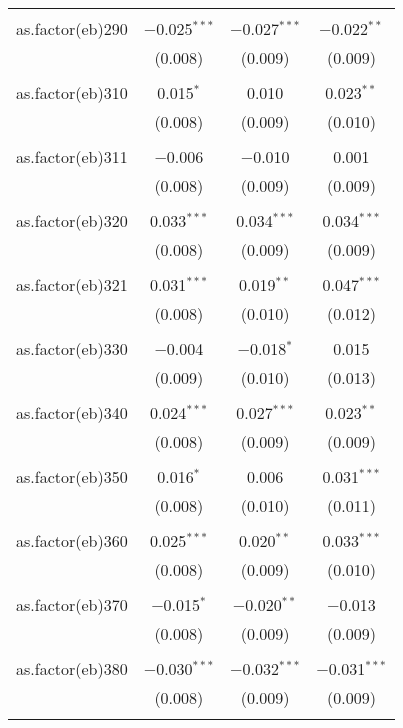 \begin{table}[!htbp]
\begin{tabular}{@{\extracolsep{5pt}}lccc}
  & & & \\ 
 as.factor(eb)290 & $-$0.025$^{***}$ & $-$0.027$^{***}$ & $-$0.022$^{**}$ \\ 
  & (0.008) & (0.009) & (0.009) \\ 
  & & & \\ 
 as.factor(eb)310 & 0.015$^{*}$ & 0.010 & 0.023$^{**}$ \\ 
  & (0.008) & (0.009) & (0.010) \\ 
  & & & \\ 
 as.factor(eb)311 & $-$0.006 & $-$0.010 & 0.001 \\ 
  & (0.008) & (0.009) & (0.009) \\ 
  & & & \\ 
 as.factor(eb)320 & 0.033$^{***}$ & 0.034$^{***}$ & 0.034$^{***}$ \\ 
  & (0.008) & (0.009) & (0.009) \\ 
  & & & \\ 
 as.factor(eb)321 & 0.031$^{***}$ & 0.019$^{**}$ & 0.047$^{***}$ \\ 
  & (0.008) & (0.010) & (0.012) \\ 
  & & & \\ 
 as.factor(eb)330 & $-$0.004 & $-$0.018$^{*}$ & 0.015 \\ 
  & (0.009) & (0.010) & (0.013) \\ 
  & & & \\ 
 as.factor(eb)340 & 0.024$^{***}$ & 0.027$^{***}$ & 0.023$^{**}$ \\ 
  & (0.008) & (0.009) & (0.009) \\ 
  & & & \\ 
 as.factor(eb)350 & 0.016$^{*}$ & 0.006 & 0.031$^{***}$ \\ 
  & (0.008) & (0.010) & (0.011) \\ 
  & & & \\ 
 as.factor(eb)360 & 0.025$^{***}$ & 0.020$^{**}$ & 0.033$^{***}$ \\ 
  & (0.008) & (0.009) & (0.010) \\ 
  & & & \\ 
 as.factor(eb)370 & $-$0.015$^{*}$ & $-$0.020$^{**}$ & $-$0.013 \\ 
  & (0.008) & (0.009) & (0.009) \\ 
  & & & \\ 
 as.factor(eb)380 & $-$0.030$^{***}$ & $-$0.032$^{***}$ & $-$0.031$^{***}$ \\ 
  & (0.008) & (0.009) & (0.009) \\ 
  & & & \\ 

\end{tabular}
\end{table}
